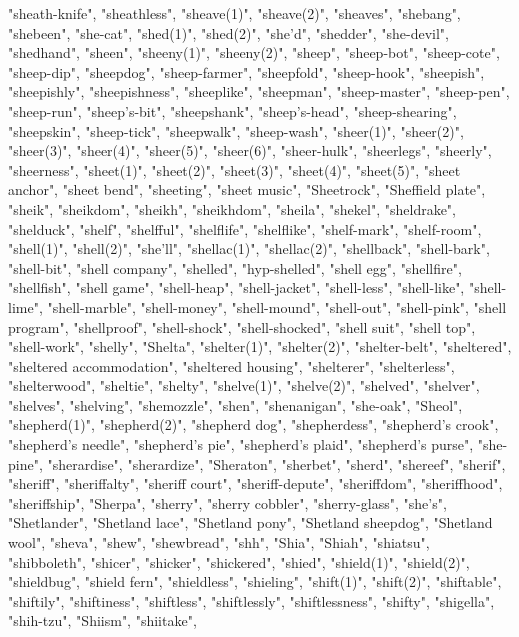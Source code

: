 "sheath-knife",
"sheathless",
"sheave(1)",
"sheave(2)",
"sheaves",
"shebang",
"shebeen",
"she-cat",
"shed(1)",
"shed(2)",
"she'd",
"shedder",
"she-devil",
"shedhand",
"sheen",
"sheeny(1)",
"sheeny(2)",
"sheep",
"sheep-bot",
"sheep-cote",
"sheep-dip",
"sheepdog",
"sheep-farmer",
"sheepfold",
"sheep-hook",
"sheepish",
"sheepishly",
"sheepishness",
"sheeplike",
"sheepman",
"sheep-master",
"sheep-pen",
"sheep-run",
"sheep's-bit",
"sheepshank",
"sheep's-head",
"sheep-shearing",
"sheepskin",
"sheep-tick",
"sheepwalk",
"sheep-wash",
"sheer(1)",
"sheer(2)",
"sheer(3)",
"sheer(4)",
"sheer(5)",
"sheer(6)",
"sheer-hulk",
"sheerlegs",
"sheerly",
"sheerness",
"sheet(1)",
"sheet(2)",
"sheet(3)",
"sheet(4)",
"sheet(5)",
"sheet anchor",
"sheet bend",
"sheeting",
"sheet music",
"Sheetrock",
"Sheffield plate",
"sheik",
"sheikdom",
"sheikh",
"sheikhdom",
"sheila",
"shekel",
"sheldrake",
"shelduck",
"shelf",
"shelfful",
"shelflife",
"shelflike",
"shelf-mark",
"shelf-room",
"shell(1)",
"shell(2)",
"she'll",
"shellac(1)",
"shellac(2)",
"shellback",
"shell-bark",
"shell-bit",
"shell company",
"shelled",
"hyp-shelled",
"shell egg",
"shellfire",
"shellfish",
"shell game",
"shell-heap",
"shell-jacket",
"shell-less",
"shell-like",
"shell-lime",
"shell-marble",
"shell-money",
"shell-mound",
"shell-out",
"shell-pink",
"shell program",
"shellproof",
"shell-shock",
"shell-shocked",
"shell suit",
"shell top",
"shell-work",
"shelly",
"Shelta",
"shelter(1)",
"shelter(2)",
"shelter-belt",
"sheltered",
"sheltered accommodation",
"sheltered housing",
"shelterer",
"shelterless",
"shelterwood",
"sheltie",
"shelty",
"shelve(1)",
"shelve(2)",
"shelved",
"shelver",
"shelves",
"shelving",
"shemozzle",
"shen",
"shenanigan",
"she-oak",
"Sheol",
"shepherd(1)",
"shepherd(2)",
"shepherd dog",
"shepherdess",
"shepherd's crook",
"shepherd's needle",
"shepherd's pie",
"shepherd's plaid",
"shepherd's purse",
"she-pine",
"sherardise",
"sherardize",
"Sheraton",
"sherbet",
"sherd",
"shereef",
"sherif",
"sheriff",
"sheriffalty",
"sheriff court",
"sheriff-depute",
"sheriffdom",
"sheriffhood",
"sheriffship",
"Sherpa",
"sherry",
"sherry cobbler",
"sherry-glass",
"she's",
"Shetlander",
"Shetland lace",
"Shetland pony",
"Shetland sheepdog",
"Shetland wool",
"sheva",
"shew",
"shewbread",
"shh",
"Shia",
"Shiah",
"shiatsu",
"shibboleth",
"shicer",
"shicker",
"shickered",
"shied",
"shield(1)",
"shield(2)",
"shieldbug",
"shield fern",
"shieldless",
"shieling",
"shift(1)",
"shift(2)",
"shiftable",
"shiftily",
"shiftiness",
"shiftless",
"shiftlessly",
"shiftlessness",
"shifty",
"shigella",
"shih-tzu",
"Shiism",
"shiitake",

